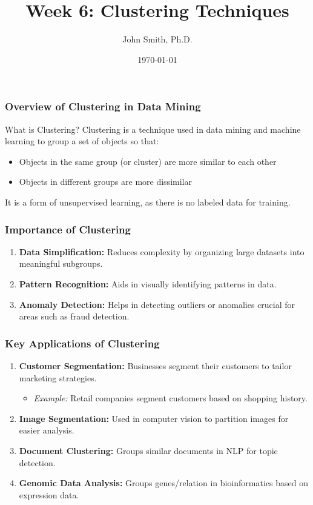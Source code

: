\documentclass[aspectratio=169]{beamer}
\title[Week 6: Clustering Techniques]{Week 6: Clustering Techniques}
\author[J. Smith]{John Smith, Ph.D.}
\institute[University Name]{
  Department of Computer Science\\
  University Name\\
  \vspace{0.3cm}
  Email: email@university.edu\\
  Website: www.university.edu
}
\date{\today}
\begin{document}
\frame{\titlepage}

\begin{frame}[fragile]
    \titlepage
\end{frame}

\begin{frame}[fragile]
    \frametitle{Overview of Clustering in Data Mining}
    \begin{block}{What is Clustering?}
        Clustering is a technique used in data mining and machine learning to group a set of objects so that:
        \begin{itemize}
            \item Objects in the same group (or cluster) are more similar to each other 
            \item Objects in different groups are more dissimilar
        \end{itemize}
        It is a form of unsupervised learning, as there is no labeled data for training.
    \end{block}
\end{frame}

\begin{frame}[fragile]
    \frametitle{Importance of Clustering}
    \begin{enumerate}
        \item \textbf{Data Simplification:} Reduces complexity by organizing large datasets into meaningful subgroups.
        \item \textbf{Pattern Recognition:} Aids in visually identifying patterns in data.
        \item \textbf{Anomaly Detection:} Helps in detecting outliers or anomalies crucial for areas such as fraud detection.
    \end{enumerate}
\end{frame}

\begin{frame}[fragile]
    \frametitle{Key Applications of Clustering}
    \begin{enumerate}
        \item \textbf{Customer Segmentation:} 
            Businesses segment their customers to tailor marketing strategies.
            \begin{itemize}
                \item \textit{Example:} Retail companies segment customers based on shopping history.
            \end{itemize}
        \item \textbf{Image Segmentation:} 
            Used in computer vision to partition images for easier analysis.
        \item \textbf{Document Clustering:} 
            Groups similar documents in NLP for topic detection.
        \item \textbf{Genomic Data Analysis:} 
            Groups genes/relation in bioinformatics based on expression data.
    \end{enumerate}
\end{frame}
\end{document}
